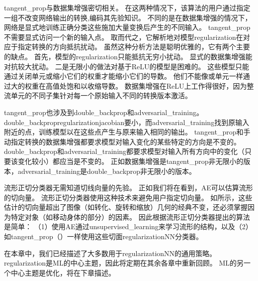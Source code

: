 \gls{tangent_prop}与数据集增强密切相关。
在这两种情况下，该算法的用户通过指定一组不改变网络输出的转换,编码其先验知识。
不同的是在数据集增强的情况下，网络是显式地训练正确分类这些施加大量变换后产生的不同输入。
\gls{tangent_prop}不需要显式访问一个新的输入点。
取而代之，它解析地对模型\gls{regularization}在对应于指定转换的方向抵抗扰动。
虽然这种分析方法是聪明优雅的，它有两个主要的缺点。
首先，模型的\gls{regularization}只能抵抗无穷小扰动。
显式的数据集增强能对抗较大扰动。
二是无限小的做法对基于\gls{ReLU}的模型是困难的。
这些模型只能通过关闭单元或缩小它们的权重才能缩小它们的导数。
他们不能像或单元一样通过大的权重在高值处饱和以收缩导数。
数据集增强在\gls{ReLU}上工作得很好，因为整流单元的不同子集针对每一个原始输入不同的转换版本激活。


\gls{tangent_prop}也涉及到\gls{double_backprop}\citep{DruckerLeCun92}和\gls{adversarial_training}\citep{Szegedy-et-al-arxiv2014,Goodfellow-2015-adversarial}。
\gls{double_backprop}\gls{regularization}\gls{jacobian}要小，而\gls{adversarial_training}找到原输入附近的点，训练模型以在这些点产生与原来输入相同的输出。
\gls{tangent_prop}和手动指定转换的数据集增强都要求模型对输入变化的某些特定的方向是不变的。
\gls{double_backprop}和\gls{adversarial_training}都要求模型对输入所有方向中的变化（只要该变化较小）都应当是不变的。
正如数据集增强是\gls{tangent_prop}非无限小的版本，\gls{adversarial_training}是\gls{double_backprop}非无限小的版本。

流形正切分类器\citep{Dauphin-et-al-NIPS2011}无需知道切线向量的先验。
正如我们将在看到，\gls{AE}可以估算流形的切向量。
流形正切分类器使用这种技术来避免用户指定切向量。
如所示，这些估计的切向量超出了图像（如转化、旋转和缩放）几何的经典不变，还必须掌握因为特定对象（如移动身体的部分）的因素。
因此根据流形正切分类器提出的算法是简单：
（1）使用\gls{AE}通过\gls{unsupervised_learning}来学习流形的结构，以及（2）如\gls{tangent_prop}（）一样使用这些切面\gls{regularization}\gls{NN}分类器。

在本章中，我们已经描述了大多数用于\gls{regularization}\gls{NN}的通用策略。
\gls{regularization}是\gls{ML}的中心主题，因此将定期在其余各章中重新回顾。
\gls{ML}的另一个中心主题是优化，将在下章描述。

